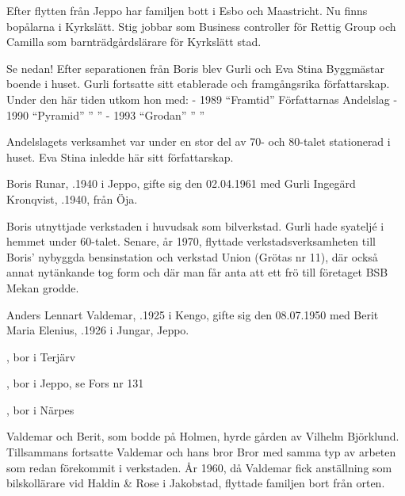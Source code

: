 Efter flytten från Jeppo har familjen bott i Esbo och Maastricht. Nu finns bopålarna i Kyrkslätt. Stig jobbar som Business controller för 	Rettig Group och Camilla som barnträdgårdslärare för Kyrkslätt stad.


Se nedan! Efter separationen från Boris blev Gurli och Eva Stina Byggmästar	boende i huset. Gurli fortsatte sitt etablerade och framgångsrika författarskap. Under den här tiden utkom hon med:
	- 1989	``Framtid''	Författarnas Andelslag
	- 1990	``Pyramid''	   ''		     ''
	- 1993	``Grodan''	   ''		     ''

Andelslagets verksamhet var under en stor del av 70- och 80-talet stationerad i huset. Eva Stina inledde här sitt författarskap.


Boris Runar, .1940 i Jeppo, gifte sig den 02.04.1961 med Gurli Ingegärd Kronqvist, .1940, från Öja.
\begin{jhchildren}
  \item {}
  \item {}
  \item {}
\end{jhchildren}

Boris utnyttjade verkstaden i huvudsak som bilverkstad. Gurli hade syateljé i hemmet under 60-talet. Senare, år 1970, flyttade 	verkstadsverksamheten till Boris' nybyggda bensinstation och verkstad Union (Grötas nr 11), där också annat nytänkande tog form och där man får anta att ett frö till företaget BSB Mekan grodde.




Anders Lennart Valdemar, .1925 i Kengo, gifte sig den 08.07.1950 med Berit Maria Elenius, .1926 i Jungar, Jeppo.
\begin{jhchildren}
  \item {}, bor i Terjärv
  \item {}, bor i Jeppo, se Fors nr 131
  \item {}, bor i Närpes
\end{jhchildren}

Valdemar och Berit, som bodde på Holmen, hyrde gården av Vilhelm 	Björklund. Tillsammans fortsatte Valdemar och hans bror Bror med 	samma typ av arbeten som redan förekommit i verkstaden. År 1960, då Valdemar fick anställning som bilskollärare vid Haldin \& Rose i Jakobstad, flyttade familjen bort från orten.

